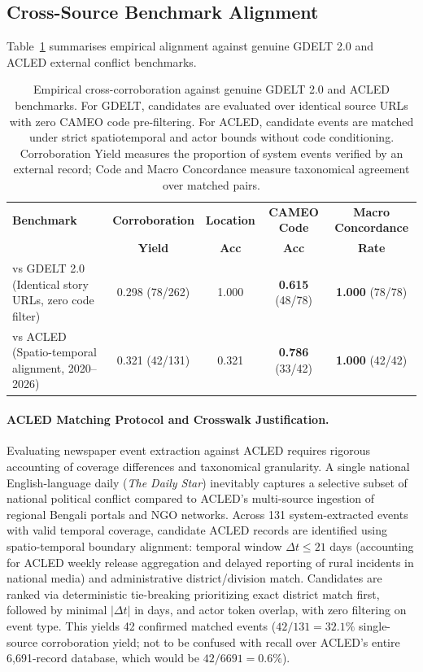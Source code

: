 \documentclass[11pt,a4paper]{article}
\begin{document}
\subsection{Cross-Source Benchmark Alignment}

Table~\ref{tab:benchmark} summarises empirical alignment against genuine GDELT 2.0 and ACLED external conflict benchmarks.

\begin{table}[h]
\centering
\caption{Empirical cross-corroboration against genuine GDELT 2.0 and ACLED benchmarks. For GDELT, candidates are evaluated over identical source URLs with zero CAMEO code pre-filtering. For ACLED, candidate events are matched under strict spatiotemporal and actor bounds without code conditioning. Corroboration Yield measures the proportion of system events verified by an external record; Code and Macro Concordance measure taxonomical agreement over matched pairs.}
\label{tab:benchmark}
\begin{tabular}{lcccc}
\toprule
\textbf{Benchmark} & \textbf{Corroboration} & \textbf{Location} & \textbf{CAMEO Code} & \textbf{Macro Concordance} \\
                   & \textbf{Yield}         & \textbf{Acc}      & \textbf{Acc}        & \textbf{Rate} \\
\midrule
vs GDELT 2.0 (Identical story URLs, zero code filter) & 0.298 (78/262) & 1.000 & \textbf{0.615} (48/78) & \textbf{1.000} (78/78) \\
vs ACLED (Spatio-temporal alignment, 2020--2026)      & 0.321 (42/131) & 0.321 & \textbf{0.786} (33/42) & \textbf{1.000} (42/42) \\
\bottomrule
\end{tabular}
\end{table}

\paragraph{ACLED Matching Protocol and Crosswalk Justification.}
Evaluating newspaper event extraction against ACLED requires rigorous accounting of coverage differences and taxonomical granularity.
A single national English-language daily (\textit{The Daily Star}) inevitably captures a selective subset of national political conflict compared to ACLED's multi-source ingestion of regional Bengali portals and NGO networks.
Across 131 system-extracted events with valid temporal coverage, candidate ACLED records are identified using spatio-temporal boundary alignment: temporal window $\Delta t \le 21$ days (accounting for ACLED weekly release aggregation and delayed reporting of rural incidents in national media) and administrative district/division match. Candidates are ranked via deterministic tie-breaking prioritizing exact district match first, followed by minimal $|\Delta t|$ in days, and actor token overlap, with zero filtering on event type.
This yields 42 confirmed matched events ($42/131 = 32.1\%$ single-source corroboration yield; not to be confused with recall over ACLED's entire 6,691-record database, which would be $42/6691 = 0.6\%$).
\end{document}
